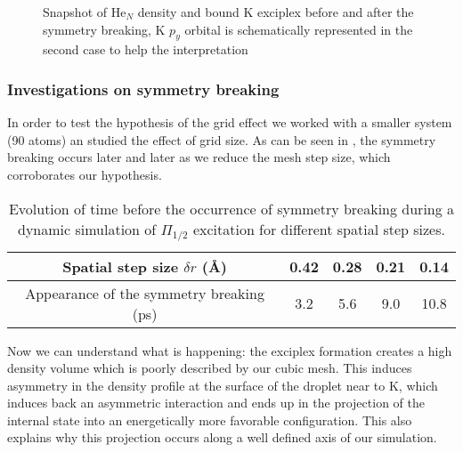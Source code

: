 \begin{figure}[h!]
\centering
	\begin{minipage}[c]{0.48\linewidth}
	\end{minipage}
\hfill
	\begin{minipage}[c]{0.48\linewidth}
	\end{minipage}
\vspace{-0.2\baselineskip}
\label{4P:p12-snap}
\caption{Snapshot of He$_N$ density and bound K exciplex before and after the symmetry breaking, K $p_y$ orbital is schematically represented in the second case to help the interpretation}
\end{figure}

\subsubsection{Investigations on symmetry breaking} 
\indent 
In order to test the hypothesis of the grid effect we worked with a smaller system (90 atoms) an studied the effect of grid size. 
As can be seen in , the symmetry breaking occurs later and later as we reduce the mesh step size, which corroborates our hypothesis.
\begin{table}[h!]
\centering
\begin{tabular}{|c|c|c|c|c|}
  \hline
  Spatial step size $\delta r$ (\AA) & 0.42 & 0.28 & 0.21 & 0.14 \\
  \hline
  Appearance of the symmetry breaking (ps) & 3.2 & 5.6 & 9.0 & 10.8 \\
  \hline
\end{tabular}
\caption{Evolution of time before the occurrence of symmetry breaking  during a dynamic simulation of  $\Pi_{1/2}$ excitation for different spatial step sizes.}
\label{table:4P-symb}
\end{table}

Now we can understand what is happening: the exciplex formation creates a high density volume which is poorly described by our cubic mesh. This induces asymmetry in the density profile at the surface of the droplet near to K, which induces back an asymmetric interaction and  ends up in the projection of the internal state into an energetically more favorable configuration. 
This also explains why this projection occurs along a well defined axis of our simulation.
%

